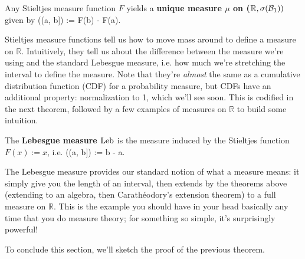 \begin{theorem}
	Any Stieltjes measure function $F$ yields a \textbf{unique measure $\mu$ on ($\mathbb R, \sigma(\mathcal{B}_{1}))$} given by
	\eq
		\mu((a, b]) := F(b) - F(a).
	\qe
\end{theorem}

Stieltjes measure functions tell us how to move mass around to define a measure on $\mathbb R$. Intuitively, they tell us about the difference between the measure we're using and the standard Lebesgue measure, i.e. how much we're stretching the interval to define the measure. Note that they're \textit{almost} the same as a cumulative distribution function (CDF) for a probability measure, but CDFs have an additional property: normalization to 1, which we'll see soon. This is codified in the next theorem, followed by a few examples of measures on $\mathbb R$ to build some intuition.

\begin{example}
	The \textbf{Lebesgue measure $\mathrm{Leb}$} is the measure induced by the Stieltjes function $F(x) := x$, i.e.
	\eq
		\Leb((a, b]) := b - a.
	\qe
\end{example}

The Lebesgue measure provides our standard notion of what a measure means: it simply give you the length of an interval, then extends by the theorems above (extending to an algebra, then Carath\'eodory's extension theorem) to a full measure on $\mathbb R$. This is the example you should have in your head basically any time that you do measure theory; for something so simple, it's surprisingly powerful! 

To conclude this section, we'll sketch the proof of the previous theorem.

